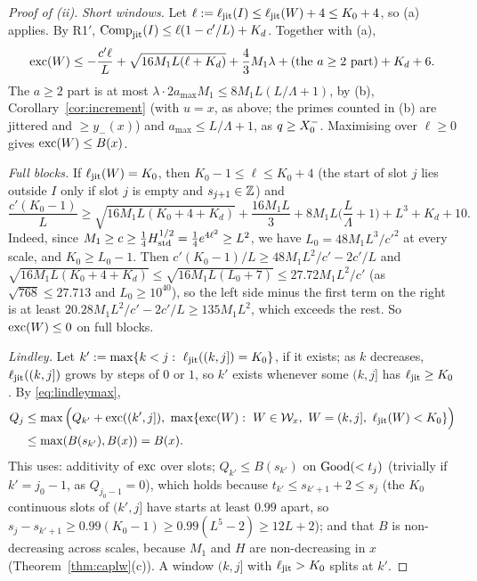 \begin{proof}[Proof of (ii)]
\emph{Short windows.} Let $\ell:=\ell_{\mathrm{jit}}(I)\le\ell_{\mathrm{jit}}(W)+4\le K_0+4$, so (a) applies. By R1$'$,
$\operatorname{Comp}_{\mathrm{jit}}(I)\le\ell(1-c'/L)+K_d$. Together with (a),
\[
\operatorname{exc}(W)\le-\frac{c'\ell}{L}+\sqrt{16M_1L(\ell+K_d)}+\frac43M_1\lambda+(\text{the $a\ge2$ part})+K_d+6.
\]
The $a\ge2$ part is at most $\lambda\cdot2a_{\max}M_1\le8M_1L(L/\Lambda+1)$, by (b), Corollary~\ref{cor:increment} (with $u=x$,
as above; the primes counted in (b) are jittered and $\ge y_-(x)$) and $a_{\max}\le L/\Lambda+1$, as $q\ge X_0^{-}$. Maximising over $\ell\ge0$ gives $\operatorname{exc}(W)\le B(x)$.

\emph{Full blocks.} If $\ell_{\mathrm{jit}}(W)=K_0$, then $K_0-1\le\ell\le K_0+4$ (the start of slot $j$ lies outside $I$ only if slot $j$ is
empty and $s_{j+1}\in\mathbb{Z}$) and
\begin{equation}\label{eq:fullblock}
\frac{c'(K_0-1)}{L}\ge\sqrt{16M_1L(K_0+4+K_d)}+\frac{16M_1L}{3}+8M_1L\Big(\frac L\Lambda+1\Big)+L^3+K_d+10.
\end{equation}
Indeed, since $M_1\ge c\ge\tfrac14H_{\mathrm{std}}^{1/2}=\tfrac14e^{4\ell^2}\ge L^2$, we have $L_0=48M_1L^3/c'^2$ at every scale, and
$K_0\ge L_0-1$. Then $c'(K_0-1)/L\ge48M_1L^2/c'-2c'/L$ and $\sqrt{16M_1L(K_0+4+K_d)}\le\sqrt{16M_1L(L_0+7)}\le27.72M_1L^2/c'$ (as
$\sqrt{768}\le27.713$ and $L_0\ge10^{40}$), so the left side minus the first term on the right is at least
$20.28M_1L^2/c'-2c'/L\ge135M_1L^2$, which exceeds the rest. So $\operatorname{exc}(W)\le0$ on full blocks.

\emph{Lindley.} Let $k':=\max\{k<j:\ \qljit((k,j])=K_0\}$, if it exists; as $k$ decreases, $\ell_{\mathrm{jit}}((k,j])$ grows by steps of
$0$ or $1$, so $k'$ exists whenever some $(k,j]$ has $\ell_{\mathrm{jit}}\ge K_0$. By \eqref{eq:lindleymax},
\begin{align*}
Q_j&\le\max\Big(Q_{k'}+\operatorname{exc}((k',j]),\ \max\{\operatorname{exc}(W):\ W\in\mathcal W_x,\ W=(k,j],\ \ell_{\mathrm{jit}}(W)<K_0\}\Big)\\
&\le\max(B(s_{k'}),B(x))=B(x).
\end{align*}
This uses: additivity of $\operatorname{exc}$ over slots; $Q_{k'}\le B(s_{k'})$ on $\mathrm{Good}(<t_j)$ (trivially if $k'=j_0-1$, as $Q_{j_0-1}=0$), which holds because
$t_{k'}\le s_{k'+1}+2\le s_j$ (the $K_0$ continuous slots of $(k',j]$ have starts at least $0.99$ apart, so
$s_j-s_{k'+1}\ge0.99(K_0-1)\ge0.99(L^5-2)\ge12L+2$); and that $B$ is non-decreasing
across scales, because $M_1$ and $H$ are non-decreasing in $x$ (Theorem~\ref{thm:caplw}(c)). A window $(k,j]$ with
$\ell_{\mathrm{jit}}>K_0$ splits at $k'$.
\end{proof}

